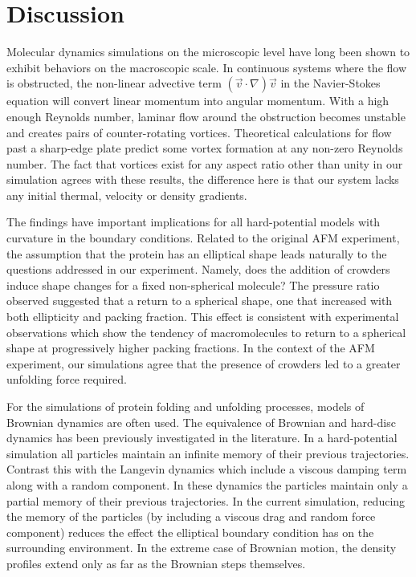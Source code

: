 \section{Discussion}

Molecular dynamics simulations on the microscopic level have long been shown to exhibit behaviors on the macroscopic scale.\cite{rapaport_art_2004} In continuous systems where the flow is obstructed, the non-linear advective term $(\vec v \cdot \nabla) \vec v$ in the Navier-Stokes equation will convert linear momentum into angular momentum.\cite{hannon_molecular_1986} With a high enough Reynolds number, laminar flow around the obstruction becomes unstable and creates pairs of counter-rotating vortices. Theoretical calculations for flow past a sharp-edge plate predict some vortex formation at any non-zero Reynolds number.\cite{miyagi_standing_1983} The fact that vortices exist for any aspect ratio other than unity in our simulation agrees with these results, the difference here is that our system lacks any initial thermal, velocity or density gradients. 

The findings have important implications for all hard-potential models with curvature in the boundary conditions. Related to the original AFM experiment,\cite{yuan_effects_2008} the assumption that the protein has an elliptical shape leads naturally to the questions addressed in our experiment. Namely, does the addition of crowders induce shape changes for a fixed non-spherical molecule? The pressure ratio observed suggested that a return to a spherical shape, one that increased with both ellipticity and packing fraction. This effect is consistent with experimental observations\cite{yuan_effects_2008, homouz_crowded_2008} which show the tendency of macromolecules to return to a spherical shape at progressively higher packing fractions. In the context of the AFM experiment, our simulations agree that the presence of crowders led to a greater unfolding force required.

For the simulations of protein folding and unfolding processes, models of Brownian dynamics are often used. The equivalence of Brownian and hard-disc dynamics has been previously investigated in the literature.\cite{hofling_critical_2008, gleim_relaxation_1998} In a hard-potential simulation all particles maintain an infinite memory of their previous trajectories. Contrast this with the Langevin dynamics which include a viscous damping term along with a random component. In these dynamics the particles maintain only a partial memory of their previous trajectories. In the current simulation, reducing the memory of the particles (by including a viscous drag and random force component) reduces the effect the elliptical boundary condition has on the surrounding environment. In the extreme case of Brownian motion, the density profiles extend only as far as the Brownian steps themselves.  


